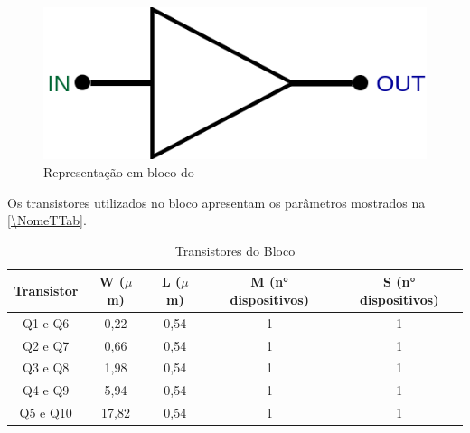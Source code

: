 \begin{figure}[htb]
 \centering
    \centering
    \caption{Representação em bloco do \NomeBloco} \label{\NomeSFig2}
    \includegraphics[scale=0.3]{Circuitos/Buffer_block.png}
\end{figure}


Os transistores utilizados no bloco \NomeBloco{} apresentam os par\^ametros mostrados na \autoref{\NomeTTab}.

\begin{table}[htb]
\caption{Transistores do Bloco \NomeBloco}
\label{\NomeTTab}
\centering
\begin{tabular}{ccccc}
\toprule
Transistor & W ($\mu$m)  & L ($\mu$m)           & M (n° dispositivos) & S (n° dispositivos)\\
\midrule \midrule
Q1 e Q6 & 0,22 & 0,54 & 1 & 1\\
\midrule
Q2 e Q7 & 0,66 & 0,54 & 1 & 1\\
\midrule
Q3 e Q8 & 1,98 & 0,54 & 1 & 1\\
\midrule
Q4 e Q9 & 5,94 & 0,54 & 1 & 1\\
\midrule
Q5 e Q10 & 17,82 & 0,54 & 1 & 1\\
\bottomrule
\end{tabular}
\end{table}